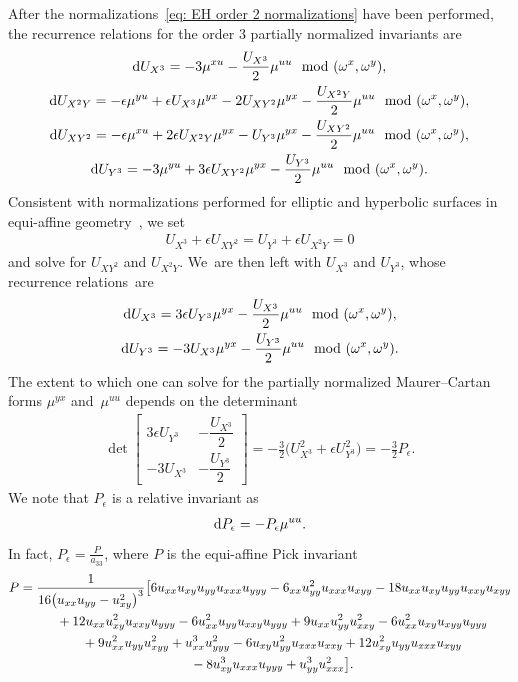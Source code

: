\documentclass[pdftex]{sigma}%
\numberwithin{equation}{section}
\begin{document}
After the normalizations~\eqref{eq: EH order 2 normalizations} have been performed, the recurrence relations for the order 3 partially normalized invariants
are
\begin{gather*}
{\rm d}U_{X^3}= -3 \mu^{xu} - \frac{U_{X^3}}{2}\mu^{uu} \mod (\omega^x,\omega^y),
\\
{\rm d}U_{X^2Y}= -\epsilon \mu^{yu}+\epsilon U_{X^3} \mu^{yx} -2U_{XY^2}\mu^{yx}-\frac{U_{X^2Y}}{2}\mu^{uu}\mod (\omega^x,\omega^y),
\\
{\rm d}U_{XY^2}= -\epsilon \mu^{xu} + 2\epsilon U_{X^2Y}\mu^{yx}-U_{Y^3}\mu^{yx} -\frac{U_{XY^2}}{2}\mu^{uu}\mod (\omega^x,\omega^y),
\\
{\rm d}U_{Y^3}= -3\mu^{yu}+3\epsilon U_{XY^2}\mu^{yx}-\frac{U_{Y^3}}{2}\mu^{uu}\mod (\omega^x,\omega^y).
\end{gather*}
Consistent with normalizations performed for elliptic and hyperbolic surfaces in equi-affine geo\-metry~\cite{O-2009diff}, we set
\begin{gather*}
U_{X^3}+\epsilon U_{XY^2} = U_{Y^3}+\epsilon U_{X^2Y}=0
\end{gather*}
and solve for $U_{XY^2}$ and $U_{X^2Y}$. We~are then left with $U_{X^3}$ and $U_{Y^3}$, whose recurrence rela\-tions~are
\begin{gather*}
{\rm d}U_{X^3} =3\epsilon U_{Y^3}\mu^{yx} - \frac{U_{X^3}}{2}\mu^{uu} \mod(\omega^x,\omega^y),
\\
{\rm d}U_{Y^3} = -3U_{X^3}\mu^{yx} - \frac{U_{Y^3}}{2}\mu^{uu} \mod(\omega^x,\omega^y).
\end{gather*}
The extent to which one can solve for the partially normalized Maurer--Cartan forms $\mu^{yx}$ and~$\mu^{uu}$ depends on the determinant
\begin{gather*}
\det \begin{bmatrix}
3\epsilon U_{Y^3} & - \dfrac{U_{X^3}}{2} \\[1.5ex]
-3U_{X^3} & - \dfrac{U_{Y^3}}{2}
\end{bmatrix} = -\frac{3}{2} \big(U_{X^3}^2+ \epsilon U_{Y^3}^2\big) = - \frac{3}{2} P_\epsilon.
\end{gather*}
We note that $P_\epsilon$ is a relative invariant as
\begin{gather*}
{\rm d}P_\epsilon = -P_\epsilon \mu^{uu}.
\end{gather*}
In fact, $P_\epsilon=\frac{P}{a_{33}}$, where $P$ is the equi-affine Pick invariant
%
\begin{gather*}
P =\frac{1}{16 \big(u_{xx} u_{yy}-u_{xy}^2\big)^3}\big[6 u_{xx}u_{xy} u_{yy} u_{xxx}u_{yyy}-6_{xx}u_{yy}^2 u_{xxx} u_{xyy} -18 u_{xx}u_{xy} u_{yy} u_{xxy} u_{xyy}
\\ \hphantom{P =}
{}+12 u_{xx}u_{xy}^2 u_{xxy} u_{yyy}-6 u_{xx}^2u_{yy} u_{xxy}u_{yyy}+9 u_{xx}u_{yy}^2 u_{xxy}^2 -6
 u_{xx}^2 u_{xy} u_{xyy} u_{yyy}
\\ \hphantom{P =}
{}+9 u_{xx}^2 u_{yy} u_{xyy}^2 +u_{xx}^3 u_{yyy}^2-6u_{xy} u_{yy}^2 u_{xxx} u_{xxy} +12 u_{xy}^2 u_{yy} u_{xxx} u_{xyy}
\\ \hphantom{P =}
{}-8 u_{xy}^3 u_{xxx} u_{yyy} + u_{yy}^3 u_{xxx}^2 \big].
\end{gather*}
\end{document}

